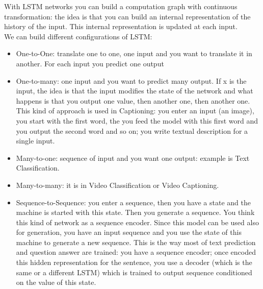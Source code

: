 With LSTM networks you can build a computation graph with continuous transformation: the idea is that you can build an internal representation of the history of the input. This internal representation is updated at each input. \\
We can build different configurations of LSTM: 
\begin{itemize}
    \item One-to-One: translate one to one, one input and you want to translate it in another. For each input you predict one output
    \item One-to-many: one input and you want to predict many output. If x is the input, the idea is that the input modifies the state of the network and what happens is that you output one value, then another one, then another one. This kind of approach is used in Captioning: you enter an input (an image), you start with the first word, the you feed the model with this first word and you output the second word and so on; you write textual description for a single input. 
    \item Many-to-one: sequence of input and you want one output: example is Text Classification. 
    \item Many-to-many: it is in Video Classification or Video Captioning.
    \item Sequence-to-Sequence: you enter a sequence, then you have a state and the machine is started with this state. Then you generate a sequence. You think this kind of network as a sequence encoder. Since this model can be used also for generation, you have an input sequence and you use the state of this machine to generate a new sequence. This is the way most of text prediction and question answer are trained: you have a sequence encoder; once encoded this hidden representation for the sentence, you use a decoder (which is the same or a different LSTM) which is trained to output sequence conditioned on the value of this state. 
\end{itemize}{}





